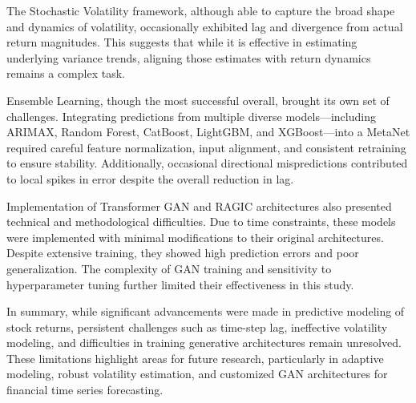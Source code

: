 The Stochastic Volatility framework, although able to capture the broad shape and dynamics of volatility, occasionally exhibited lag and divergence from actual return magnitudes. This suggests that while it is effective in estimating underlying variance trends, aligning those estimates with return dynamics remains a complex task.

Ensemble Learning, though the most successful overall, brought its own set of challenges. Integrating predictions from multiple diverse models—including ARIMAX, Random Forest, CatBoost, LightGBM, and XGBoost—into a MetaNet required careful feature normalization, input alignment, and consistent retraining to ensure stability. Additionally, occasional directional mispredictions contributed to local spikes in error despite the overall reduction in lag.

Implementation of Transformer GAN and RAGIC architectures also presented technical and methodological difficulties. Due to time constraints, these models were implemented with minimal modifications to their original architectures. Despite extensive training, they showed high prediction errors and poor generalization. The complexity of GAN training and sensitivity to hyperparameter tuning further limited their effectiveness in this study.

In summary, while significant advancements were made in predictive modeling of stock returns, persistent challenges such as time-step lag, ineffective volatility modeling, and difficulties in training generative architectures remain unresolved. These limitations highlight areas for future research, particularly in adaptive modeling, robust volatility estimation, and customized GAN architectures for financial time series forecasting.